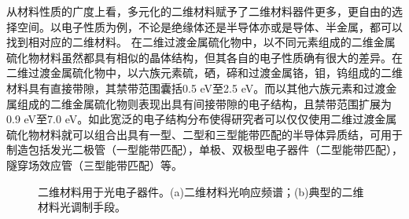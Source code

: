     从材料性质的广度上看，多元化的二维材料赋予了二维材料器件更多，更自由的选择空间。以电子性质为例，不论是绝缘体还是半导体亦或是导体、半金属，都可以找到相对应的二维材料。
    在二维过渡金属硫化物中，以不同元素组成的二维金属硫化物材料虽然都具有相似的晶体结构，但其各自的电子性质确有很大的差异。在二维过渡金属硫化物中，以六族元素硫，硒，碲和过渡金属铬，钼，钨组成的二维材料具有直接带隙，其禁带范围囊括0.5 eV至2.5 eV。而以其他六族元素和过渡金属组成的二维金属硫化物则表现出具有间接带隙的电子结构，且禁带范围扩展为0.9 eV至7.0 eV。如此宽泛的电子结构分布使得研究者可以仅仅使用二维过渡金属硫化物材料就可以组合出具有一型、二型和三型能带匹配的半导体异质结，可用于制造包括发光二极管（一型能带匹配），单极、双极型电子器件（二型能带匹配），隧穿场效应管（三型能带匹配）等。

    \begin{figure}[htb]
        \caption{二维材料用于光电子器件。(a)二维材料光响应频谱；(b)典型的二维材料光调制手段。}
        \label{}
    \end{figure}

